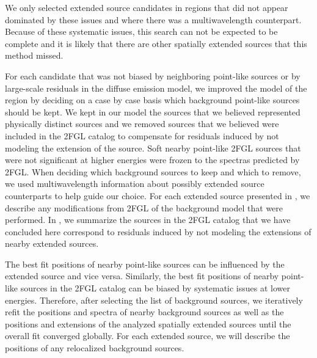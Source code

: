 We only selected extended source candidates in regions that did not
appear dominated by these issues and where there was a multiwavelength
counterpart. Because of these systematic issues, this search can not be
expected to be complete and it is likely that there are other spatially
extended sources that this method missed.



For each candidate that was not biased by neighboring point-like
sources or by large-scale residuals in the diffuse emission model, we
improved the model of the region by deciding on a case by case basis
which background point-like sources should be kept.  We kept in our
model the sources that we believed represented physically distinct
sources and we removed sources that we believed were included in the
2FGL catalog to compensate for residuals induced by not modeling the
extension of the source.  Soft nearby point-like 2FGL sources that
were not significant at higher energies were frozen to the spectras
predicted by 2FGL.  When deciding which background sources to keep and
which to remove, we used multiwavelength information about possibly
extended source counterparts to help guide our choice. For each extended
source presented in , we describe any
modifications from 2FGL of the background model that were performed.
In , we summarize the sources in the 2FGL
catalog that we have concluded here correspond to residuals induced by
not modeling the extensions of nearby extended sources.

The best fit positions of nearby point-like sources can be influenced by
the extended source and vice versa.  Similarly, the best fit positions
of nearby point-like sources in the 2FGL catalog can be biased by
systematic issues at lower energies.  Therefore, after selecting the list
of background sources, we iteratively refit the positions and spectra
of nearby background sources as well as the positions and extensions of
the analyzed spatially extended sources until the overall fit converged
globally.  For each extended source, we will describe the positions of
any relocalized background sources.

